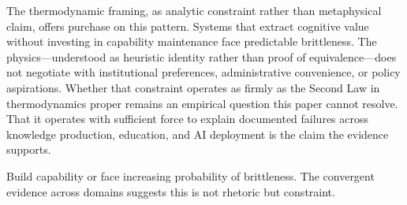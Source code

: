 The thermodynamic framing, as analytic constraint rather than metaphysical claim, offers purchase on this pattern. Systems that extract cognitive value without investing in capability maintenance face predictable brittleness. The physics—understood as heuristic identity rather than proof of equivalence—does not negotiate with institutional preferences, administrative convenience, or policy aspirations. Whether that constraint operates as firmly as the Second Law in thermodynamics proper remains an empirical question this paper cannot resolve. That it operates with sufficient force to explain documented failures across knowledge production, education, and AI deployment is the claim the evidence supports.

Build capability or face increasing probability of brittleness. The convergent evidence across domains suggests this is not rhetoric but constraint.
